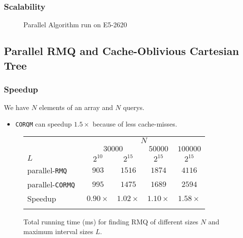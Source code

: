 \begin{frame}
	\frametitle{Scalability}
	\begin{figure}[!ht]
		\centering
		\subfigure[Scalability]{
			
			\label{fig:fig-parallel}
		}
		\caption{Parallel Algorithm run on E5-2620}
	\end{figure}
\end{frame}

\subsection{Parallel RMQ and Cache-Oblivious Cartesian Tree}
\begin{frame}
	\frametitle{Speedup}
	We have $N$ elements of an array and $N$ querys.
	\begin{itemize}
		\setlength\itemsep{1em}
		\item \texttt{CORQM} can speedup $1.5\times$ because of less cache-misses.
	\end{itemize}
	\begin{figure}[!ht]
		\begin{center}
			\begin{tabular}{l c c c c}
				\firsthline
					& \multicolumn{4}{c}{$N$} \\
					\cline{2-5}
						& \multicolumn{2}{c}{$30000$} & $50000$ & $100000$ \\
					$L$ & $2^{10}$ & $2^{15}$ & $2^{15}$ & $2^{15}$ \\
					\hline
					parallel-\tt{RMQ}   & $903$ & $1516$ & $1874$ & $4116$ \\
					parallel-\tt{CORMQ} & $995$ & $1475$ & $1689$ & $2594$ \\
					\hline
					Speedup & $0.90\times$ & $1.02\times$ & $1.10\times$ & $1.58\times$\\
				\lasthline
			\end{tabular}
			\caption{Total running time (ms) for finding RMQ of different sizes $N$ and maximum interval sizes $L$.}
			\label{fig:CORMQ}
		\end{center}
	\end{figure}
\end{frame}